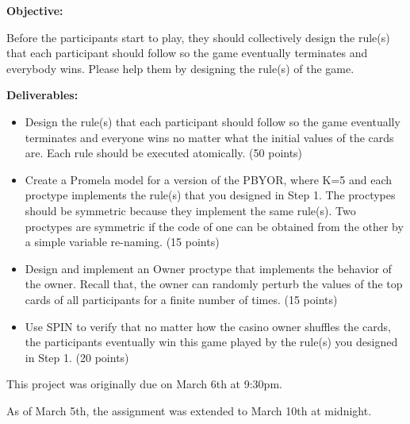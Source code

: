 \documentclass[a4paper,portrait,12pt]{article}
\begin{document}
\newpage

\begin{flushleft}

\textbf{Objective:}

Before the participants start to play, they should collectively design the rule(s) that each participant should follow so the game eventually terminates and everybody wins. Please help them by designing the rule(s) of the game.
\end{flushleft}


\begin{flushleft}
\textbf{Deliverables:}

\begin{itemize}
	\item Design the rule(s) that each participant should follow so the game eventually terminates and everyone wins no matter what the initial values of the cards are. Each rule should be executed atomically. (50 points)
	\item Create a Promela model for a version of the PBYOR, where K=5 and each proctype implements the rule(s) that you designed in Step 1. The proctypes should be symmetric because they implement the same rule(s). Two proctypes are symmetric if the code of one can be obtained from the other by a simple variable re-naming. (15 points)
	\item Design and implement an Owner proctype that implements the behavior of the owner. Recall that, the owner can randomly perturb the values of the top cards of all participants for a finite number of times. (15 points)
	\item Use SPIN to verify that no matter how the casino owner shuffles the cards, the participants eventually win this game played by the rule(s) you designed in Step 1. (20 points)
\end{itemize}

\end{flushleft}

\begin{flushleft}
This project was originally due on March 6th at 9:30pm.

As of March 5th, the assignment was extended to March 10th at midnight.
\end{flushleft}



\newpage
\end{document}

